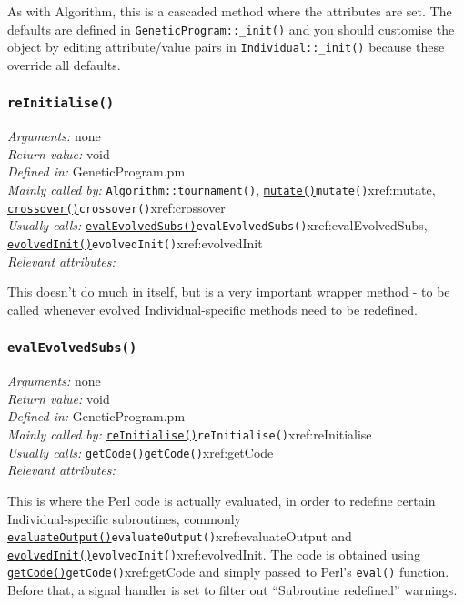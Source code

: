 \documentclass[a4paper]{article}
\begin{document}
As with Algorithm, this is a cascaded method where the attributes are
set.  The defaults are defined in \texttt{GeneticProgram::\_init()}
and you should customise the object by editing attribute/value pairs
in \texttt{Individual::\_init()} because these override all defaults.

\subsubsection{\texttt{reInitialise()}}\label{xref:reInitialise}
\begin{flushleft}
\textit{Arguments:} none\\
\textit{Return value:} void\\
\textit{Defined in:} GeneticProgram.pm\\
\textit{Mainly called by:} \texttt{Algorithm::tournament()}, \hyperref[no]{\texttt{mutate()}}{\texttt{mutate()}}{xref:mutate}, \hyperref[no]{\texttt{crossover()}}{\texttt{crossover()}}{xref:crossover}\\
\textit{Usually calls:} \hyperref[no]{\texttt{evalEvolvedSubs()}}{\texttt{evalEvolvedSubs()}}{xref:evalEvolvedSubs}, \hyperref[no]{\texttt{evolvedInit()}}{\texttt{evolvedInit()}}{xref:evolvedInit}\\
\textit{Relevant attributes:}
\end{flushleft}

This doesn't do much in itself, but is a very important wrapper method
- to be called whenever evolved Individual-specific methods need to be
redefined.

\subsubsection{\texttt{evalEvolvedSubs()}}\label{xref:evalEvolvedSubs}
\begin{flushleft}
\textit{Arguments:} none\\
\textit{Return value:} void\\
\textit{Defined in:} GeneticProgram.pm\\
\textit{Mainly called by:} \hyperref[no]{\texttt{reInitialise()}}{\texttt{reInitialise()}}{xref:reInitialise}\\
\textit{Usually calls:} \hyperref[no]{\texttt{getCode()}}{\texttt{getCode()}}{xref:getCode}\\
\textit{Relevant attributes:}
\end{flushleft}

This is where the Perl code is actually evaluated, in order to
redefine certain Individual-specific subroutines, commonly
\hyperref[no]{\texttt{evaluateOutput()}}{\texttt{evaluateOutput()}}{xref:evaluateOutput} and \hyperref[no]{\texttt{evolvedInit()}}{\texttt{evolvedInit()}}{xref:evolvedInit}.  The code is
obtained using \hyperref[no]{\texttt{getCode()}}{\texttt{getCode()}}{xref:getCode} and simply passed to Perl's
\texttt{eval()} function.  Before that, a signal handler is set to
filter out ``Subroutine redefined'' warnings.
\end{document}
